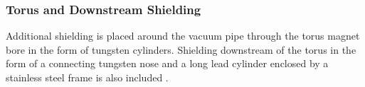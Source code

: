 \subsubsection{Torus and Downstream Shielding}
Additional shielding is placed around the vacuum pipe through the torus magnet bore in the form of tungsten cylinders.
Shielding downstream of the torus in the form of a connecting tungsten nose and a long lead cylinder enclosed
by a stainless steel frame is also included \cite{beamline-nim}.
